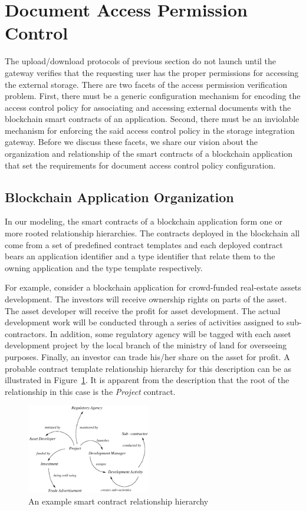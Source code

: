 \documentclass[conference]{IEEEtran}
\begin{document}




\section{Document Access Permission Control}
\label{s-accr}
The upload/download protocols of previous section do not launch until the gateway verifies that the requesting user has the proper permissions for accessing the external storage. There are two facets of the access permission verification problem. First, there must be a generic configuration mechanism for encoding the access control policy for associating and accessing external documents with the blockchain smart contracts of an application. Second, there must be an inviolable mechanism for enforcing the said access control policy in the storage integration gateway. Before we discuss these facets, we share our vision about the organization and relationship of the smart contracts of a blockchain application that set the requirements for document access control policy configuration.

\subsection{Blockchain Application Organization}
In our modeling, the smart contracts of a blockchain application form one or more rooted relationship hierarchies. The contracts deployed in the blockchain all come from a set of predefined contract templates and each deployed contract bears an application identifier and a type identifier that relate them to the owning application and the type template respectively.

For example, consider a blockchain application for crowd-funded real-estate assets development. The investors will receive ownership rights on parts of the asset. The asset developer will receive the profit for asset development. The actual development work will be conducted through a series of activities assigned to sub-contractors. In addition, some regulatory agency will be tagged with each asset development project by the local branch of the ministry of land for overseeing purposes. Finally, an investor can trade his/her share on the asset for profit. A probable contract template relationship hierarchy for this description can be as illustrated in Figure~\ref{fig-2}. It is apparent from the description that the root of the relationship in this case is the {\it Project} contract.
\begin{figure}[h]
\label{fig-2}
\centering
\includegraphics[width=0.48\textwidth]{access-req-example}                    
\caption{An example smart contract relationship hierarchy}
\end{figure}
\end{document}
